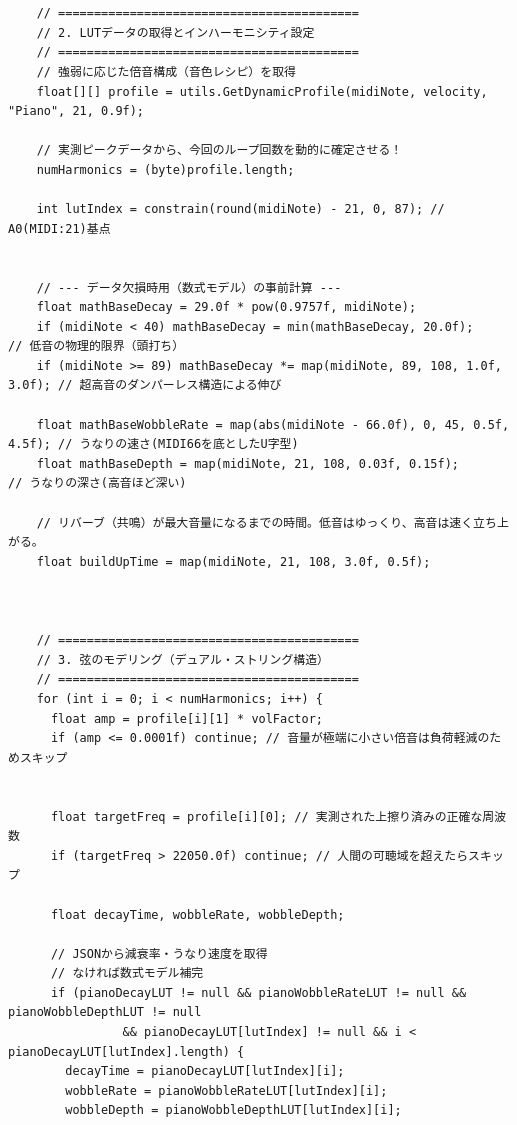 \begin{lstlisting}[caption={Piano.pde}, label={lst:proc_piano}]
    
    
    // ==========================================
    // 2. LUTデータの取得とインハーモニシティ設定
    // ==========================================
    // 強弱に応じた倍音構成（音色レシピ）を取得
    float[][] profile = utils.GetDynamicProfile(midiNote, velocity, "Piano", 21, 0.9f);
    
    // 実測ピークデータから、今回のループ回数を動的に確定させる！
    numHarmonics = (byte)profile.length;
    
    int lutIndex = constrain(round(midiNote) - 21, 0, 87); // A0(MIDI:21)基点
    
    
    // --- データ欠損時用（数式モデル）の事前計算 ---
    float mathBaseDecay = 29.0f * pow(0.9757f, midiNote);
    if (midiNote < 40) mathBaseDecay = min(mathBaseDecay, 20.0f);            // 低音の物理的限界（頭打ち）
    if (midiNote >= 89) mathBaseDecay *= map(midiNote, 89, 108, 1.0f, 3.0f); // 超高音のダンパーレス構造による伸び
    
    float mathBaseWobbleRate = map(abs(midiNote - 66.0f), 0, 45, 0.5f, 4.5f); // うなりの速さ(MIDI66を底としたU字型)
    float mathBaseDepth = map(midiNote, 21, 108, 0.03f, 0.15f);               // うなりの深さ(高音ほど深い)

    // リバーブ（共鳴）が最大音量になるまでの時間。低音はゆっくり、高音は速く立ち上がる。
    float buildUpTime = map(midiNote, 21, 108, 3.0f, 0.5f);
    
    

    // ==========================================
    // 3. 弦のモデリング（デュアル・ストリング構造）
    // ==========================================
    for (int i = 0; i < numHarmonics; i++) {
      float amp = profile[i][1] * volFactor;
      if (amp <= 0.0001f) continue; // 音量が極端に小さい倍音は負荷軽減のためスキップ
      
      
      float targetFreq = profile[i][0]; // 実測された上擦り済みの正確な周波数
      if (targetFreq > 22050.0f) continue; // 人間の可聴域を超えたらスキップ
      
      float decayTime, wobbleRate, wobbleDepth;
      
      // JSONから減衰率・うなり速度を取得
      // なければ数式モデル補完
      if (pianoDecayLUT != null && pianoWobbleRateLUT != null && pianoWobbleDepthLUT != null 
                && pianoDecayLUT[lutIndex] != null && i < pianoDecayLUT[lutIndex].length) {
        decayTime = pianoDecayLUT[lutIndex][i];
        wobbleRate = pianoWobbleRateLUT[lutIndex][i];
        wobbleDepth = pianoWobbleDepthLUT[lutIndex][i];
        

\end{lstlisting}
